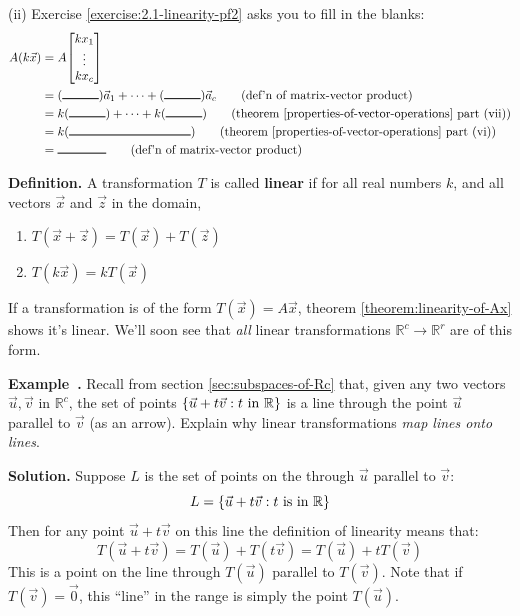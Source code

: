 \documentclass[11pt, letterpaper]{report}
\newenvironment{notes}{}{}
\newenvironment{book}{}{}
\let\originalleft\left
\let\originalright\right
\renewcommand{\left}{\mathopen{}\mathclose\bgroup\originalleft}
\renewcommand{\right}{\aftergroup\egroup\originalright}
\newcounter{exercise}[section]
\newcounter{example}[section]
\newcommand{\example}{\refstepcounter{example}%
\par\noindent\textbf{Example~\theexample.} }
\newenvironment{definition}{\begin{bbox}\par\noindent\textbf{Definition. }}
  {\end{bbox}}
\newcounter{theorem}[chapter]
\newlength\oldfboxsep%
\newlength\myminiwidth%
\newenvironment{bbox}{%
  \setlength\oldfboxsep\fboxsep
  \setlength{\fboxsep}{.1in}%
  \setlength\myminiwidth\linewidth%
  \addtolength\myminiwidth{-0.2in}%
  \vspace{0.1in}%
  \begin{lrbox}{\bboxbox}\begin{minipage}{\myminiwidth}%
    }{%
    \end{minipage}\end{lrbox}%
  \noindent\fbox{\usebox{\bboxbox}}\vspace{0.1in}\setlength\fboxsep\oldfboxsep%
}
\newcommand{\R}{\mathbb{R}}
\newcommand{\bbbvec}[3]{
  \begin{bmatrix} #1 \\ #2 \\ #3 \end{bmatrix}
}
\begin{document}
(ii) Exercise \ref{exercise:2.1-linearity-pf2} asks you to fill in the blanks:
\begin{align*}
A ( k\vec{x} ) &= A \bbbvec{kx_1}{\vdots}{kx_c}  \\
&= (\rule{3em}{0.8pt})\vec{a}_1 + \cdots + (\rule{3em}{0.8pt})\vec{a}_c \quad \quad \text{(def'n of matrix-vector product)} \\
&= k (  \rule{3em}{0.8pt} ) + \cdots +  k (  \rule{3em}{0.8pt} ) \quad \quad \text{(theorem \ref{properties-of-vector-operations} part (vii))} \\
&= k (\rule{10em}{0.8pt}) \quad \quad \text{(theorem \ref{properties-of-vector-operations} part (vi))} \\
&= \rule{4em}{0.8pt} \quad \quad \text{(def'n of matrix-vector product)} 
\end{align*}
\blacksquare

\begin{definition} 
A transformation $T$ is called \textbf{linear} if for all real numbers $k$, and all vectors $\vec{x}$ and $\vec{z}$ in the domain,
\begin{enumerate}[label=(\roman*)]
\item $T ( \vec{x}+\vec{z} ) = T ( \vec{x} ) + T ( \vec{z} )$
\item $T ( k \vec{x} )= k T ( \vec{x} )$
\end{enumerate}
\end{definition}

If a transformation is of the form $T ( \vec{x} )= A\vec{x}$, theorem \ref{theorem:linearity-of-Ax} shows it's linear. We'll soon see that \emph{all} linear transformations $\R^c \rightarrow \R^r$ are of this form. 

\begin{notes}
\end{notes}

\example Recall from section \ref{sec:subspaces-of-Rc} that, given any two vectors $\vec{u},\vec{v}$ in $\R^c$, the set of points $\left\{ \vec{u} + t\vec{v} : t \text{ in } \R \right\}$ is a line through the point $\vec{u}$ parallel to $\vec{v}$ (as an arrow).  Explain why linear transformations \emph{map lines onto lines}.

\begin{book}
\textbf{Solution.} Suppose $L$ is the set of points on the through $\vec{u}$ parallel to $\vec{v}$:
\[L= \left\{ \vec{u}+t\vec{v}:t \text{ is in } \R \right\}\]
Then for any point $\vec{u}+t\vec{v}$ on this line the definition of linearity means that:
\[T(\vec{u}+t\vec{v}) = T(\vec{u}) + T(t\vec{v}) = T(\vec{u}) + tT(\vec{v})\]
This is a point on the line through $T(\vec{u})$ parallel to $T(\vec{v})$. Note that if $T(\vec{v}) = \vec{0}$, this ``line'' in the range is simply the point $T(\vec{u})$. \blacksquare
\end{book}
\end{document}
